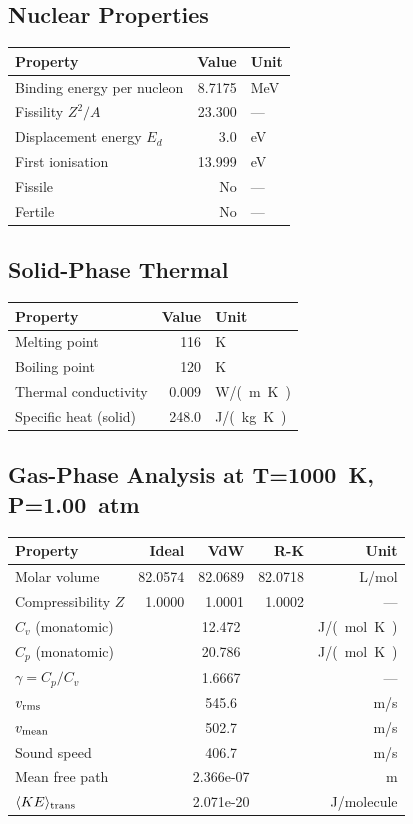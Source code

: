 \documentclass[11pt,a4paper]{article}
\begin{document}
\subsection{Nuclear Properties}
\begin{tabular}{lrl}
  \toprule
  Property & Value & Unit \\
  \midrule
  Binding energy per nucleon & 8.7175 & \si{MeV} \\
  Fissility $Z^2/A$ & 23.300 & --- \\
  Displacement energy $E_d$ & 3.0 & \si{eV} \\
  First ionisation & 13.999 & \si{eV} \\
  Fissile & No & --- \\
  Fertile & No & --- \\
  \bottomrule
\end{tabular}

\subsection{Solid-Phase Thermal}
\begin{tabular}{lrl}
  \toprule
  Property & Value & Unit \\
  \midrule
  Melting point & 116 & \si{K} \\
  Boiling point & 120 & \si{K} \\
  Thermal conductivity & 0.009 & \si{W/(m.K)} \\
  Specific heat (solid) & 248.0 & \si{J/(kg.K)} \\
  \bottomrule
\end{tabular}

\subsection{Gas-Phase Analysis at T=\SI{1000}{K}, P=\SI{1.00}{atm}}
\begin{tabular}{lrrrr}
  \toprule
  Property & Ideal & VdW & R-K & Unit \\
  \midrule
  Molar volume & 82.0574 & 82.0689 & 82.0718 & \si{L/mol} \\
  Compressibility $Z$ & 1.0000 & 1.0001 & 1.0002 & --- \\
  \midrule
  $C_v$ (monatomic) & \multicolumn{3}{c}{12.472} & \si{J/(mol.K)} \\
  $C_p$ (monatomic) & \multicolumn{3}{c}{20.786} & \si{J/(mol.K)} \\
  $\gamma = C_p/C_v$ & \multicolumn{3}{c}{1.6667} & --- \\
  $v_{\rm rms}$ & \multicolumn{3}{c}{545.6} & \si{m/s} \\
  $v_{\rm mean}$ & \multicolumn{3}{c}{502.7} & \si{m/s} \\
  Sound speed & \multicolumn{3}{c}{406.7} & \si{m/s} \\
  Mean free path & \multicolumn{3}{c}{2.366e-07} & \si{m} \\
  $\langle KE \rangle_{\rm trans}$ & \multicolumn{3}{c}{2.071e-20} & \si{J/molecule} \\
  \bottomrule
\end{tabular}
\end{document}
